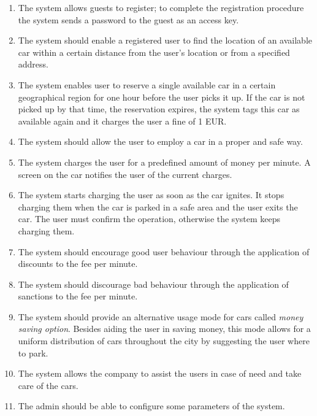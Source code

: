 			
			
			
			\begin{enumerate}
				\item The system allows guests to register; to complete the registration procedure the system sends a password to the guest as an access key.
				\item The system should enable a registered user to find the location of an available car within a certain distance from the user's location or from a specified address.
				\item The system enables user to reserve a single available car in a certain geographical region for one hour before the user picks it up. If the car is not picked up by that time, the reservation expires, the system tags this car as available again and it charges the user a fine of 1 EUR.
				
				\item The system should allow the user to employ a car in a proper and safe way. 				
								
				\item The system charges the user for a predefined amount of money per minute. A screen on the car notifies the user of the current charges.
				\item The system starts charging the user as soon as the car ignites. It stops charging them when the car is parked in a safe area and the user exits the car. The user must confirm the operation, otherwise the system keeps charging them. 
				\item The system should encourage good user behaviour through the application of discounts to the fee per minute. 
				\item The system should discourage bad behaviour through the application of sanctions to the fee per minute. 
				\item The system should provide an alternative usage mode for cars called \textit{money saving option}. Besides aiding the user in saving money, this mode allows for a uniform distribution of cars throughout the city by suggesting the user where to park.
				\item The system allows the company to assist the users in case of need and take care of the cars.				
				\item The admin should be able to configure some parameters of the system.
			\end{enumerate}						
			
